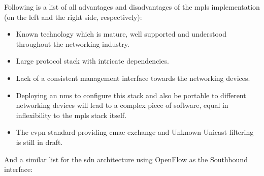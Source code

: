 
Following is a list of all advantages and disadvantages of the \ac{mpls} implementation (on the left and the right side, respectively):

\begin{minipage}[t]{0.5\textwidth}
\begin{itemize}[label=\checkmark]
	\item Known technology which is mature, well supported and understood throughout the networking industry.
\end{itemize}
\end{minipage}%
\begin{minipage}[t]{0.5\textwidth}
\begin{itemize}[label=$\times$]
	\item Large protocol stack with intricate dependencies.
	\item Lack of a consistent management interface towards the networking devices.
	\item Deploying an \ac{nms} to configure this stack and also be portable to different networking devices will lead to a complex piece of software, equal in inflexibility to the \ac{mpls} stack itself.
	\item The \ac{evpn} standard providing \ac{cmac} exchange and Unknown Unicast filtering is still in draft.
\end{itemize}
\end{minipage}

And a similar list for the \ac{sdn} architecture using OpenFlow as the Southbound interface:

